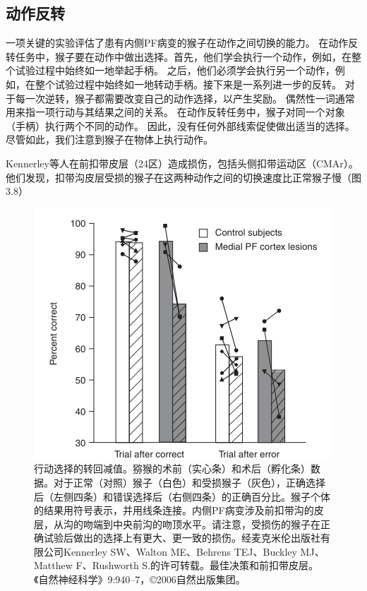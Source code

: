 \subsection{动作反转}

一项关键的实验评估了患有内侧PF病变的猴子在动作之间切换的能力\cite{Kennerleyet al,2006}。
在动作反转任务中，猴子要在动作中做出选择。首先，他们学会执行一个动作，例如，在整个试验过程中始终如一地举起手柄。
之后，他们必须学会执行另一个动作，例如，在整个试验过程中始终如一地转动手柄。接下来是一系列进一步的反转。
对于每一次逆转，猴子都需要改变自己的动作选择，以产生奖励。
偶然性一词通常用来指一项行动与其结果之间的关系。
在动作反转任务中，猴子对同一个对象（手柄）执行两个不同的动作。
因此，没有任何外部线索促使做出适当的选择。
尽管如此，我们注意到猴子在物体上执行动作。\par
Kennerley等人在前扣带皮层（24区）造成损伤，包括头侧扣带运动区（CMAr）。
他们发现，扣带沟皮层受损的猴子在这两种动作之间的切换速度比正常猴子慢（图3.8）\par


\begin{figure}[!htb]
	\centering
 	\includegraphics{image_pfc/Fig_3_8}
	\caption{行动选择的转回减值。猕猴的术前（实心条）和术后（孵化条）数据。对于正常（对照）猴子（白色）和受损猴子（灰色），正确选择后（左侧四条）和错误选择后（右侧四条）的正确百分比。猴子个体的结果用符号表示，并用线条连接。内侧PF病变涉及前扣带沟的皮层，从沟的吻端到中央前沟的吻顶水平。请注意，受损伤的猴子在正确试验后做出的选择上有更大、更一致的损伤。经麦克米伦出版社有限公司Kennerley SW、Walton ME、Behrens TEJ、Buckley MJ、Matthew F、Rushworth S.的许可转载。最佳决策和前扣带皮层。《自然神经科学》9:940–7，©2006自然出版集团。}
	\label{fig:fig}
\end{figure}


